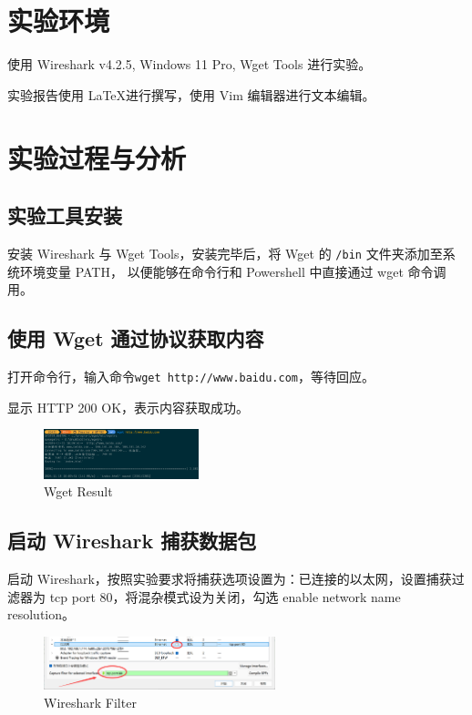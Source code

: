 \documentclass[14pt,a4paper,UTF8,twoside]{article}
\begin{document}
\section{实验环境}

使用 Wireshark v4.2.5, Windows 11 Pro, Wget Tools 进行实验。

实验报告使用 \LaTeX 进行撰写，使用 Vim 编辑器进行文本编辑。

\section{实验过程与分析}

\subsection{实验工具安装}
安装 Wireshark 与 Wget Tools，安装完毕后，将 Wget 的 \texttt{/bin} 文件夹添加至系统环境变量 PATH，
以便能够在命令行和 Powershell 中直接通过 wget 命令调用。

\subsection{使用 Wget 通过协议获取内容}

打开命令行，输入命令\texttt{wget http://www.baidu.com}，等待回应。

显示 HTTP 200 OK，表示内容获取成功。

\begin{figure}[H]
  \centering
  \includegraphics[width=0.4\textwidth]{lab1/WgetResult.png}
  \caption{Wget Result}
\end{figure}

\subsection{启动 Wireshark 捕获数据包}

启动 Wireshark，按照实验要求将捕获选项设置为：已连接的以太网，设置捕获过滤器为 tcp port 80，将混杂模式设为关闭，勾选 enable network name resolution。

\begin{figure}[H]
  \centering
  \includegraphics[width=0.6\textwidth]{lab1/fitler.jpg}
  \caption{Wireshark Filter}
\end{figure}
\end{document}
